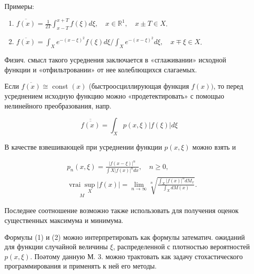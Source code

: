 \documentclass[10pt]{article}
\begin{document}
Примеры:



\begin{enumerate}

  \item $\overline{f(x)}=\frac{1}{2 T} \int_{x-T}^{x+T} f(\xi) d \xi, \quad x \in \mathbb{R}^{1}, \quad x \pm T \in X$.



  \item $\overline{f(x)}=\int_{X} e^{-(x-\xi)^{2}} f(\xi) d \xi / \int_{X} e^{-(x-\xi)^{2}} d \xi, \quad x \mp \xi \in X$.



\end{enumerate}



Физич. смысл такого усреднения заключается в «сглаживании» исходной функции и «отфильтровании» от нее колеблющихся слагаемых.



Если $\overline{f(x)} \cong$ const $(x)$ (быстроосциллирующая функция $f(x))$, то перед усреднением исходную функцию можно «продетектировать» с помощыо нелинейного преобразования, напр.



\[

\overline{\overline{f(x)}}=\int_{X} p(x, \xi)|f(\xi)| d \xi

\]



В качестве взвешивающей при усреднении функции $p(x, \xi)$ можно взять и



\[

\begin{aligned}

& p_{n}(x, \xi)=\frac{|f(x-\xi)|^{n}}{\int X|f(x)|^{n} d x}, \quad n \geqslant 0, \\

& \underset{M}{\operatorname{vrai} \sup _{X}}|f(x)|=\lim _{n \rightarrow \infty} \sqrt[n]{\frac{\int_{X}|f(x)|^{n} d M_{x}}{\int_{X} d M(x)}} .

\end{aligned}

\]



Последнее соотношение возможно также использовать для получения оценок существенных максимума и минимума.



Формулы (1) и (2) можно интерпретировать как формулы затематич. ожиданий для функции случайной величины $\xi$, распределенной с плотностью вероятностей $p(x, \xi)$. Поәтому данную М. 3. можно трактовать как задачу стохастического программирования и применять к ней его методы.
\end{document}
